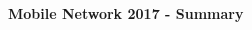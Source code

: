 \documentclass[10pt,a4paper,landscape]{article}
\def\labelitemi{--}
\begin{document}
\raggedright
\footnotesize

\renewcommand\labelitemi{$\triangleright$}
\renewcommand\labelitemii{$\triangleright$}

\begin{center}
     \huge{\textbf{Mobile Network 2017 - Summary}} \\
\end{center}

\tableofcontents
\newpage

\begin{multicols*}{2}

\setlength{\columnseprule}{0.25pt}
\setlength{\premulticols}{1pt}
\setlength{\postmulticols}{1pt}
\setlength{\multicolsep}{1pt}
\setlength{\columnsep}{2pt}



\end{multicols*}
\end{document}
